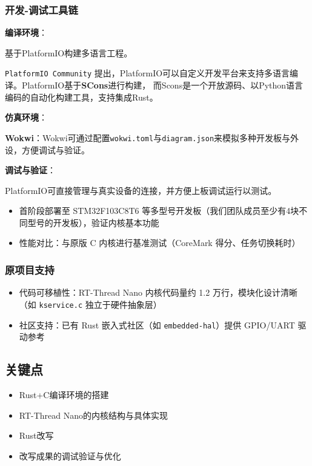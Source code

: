 \subsubsection{开发-调试工具链}

\textbf{编译环境}：

基于PlatformIO构建多语言工程。

{\texttt{PlatformIO Community}} 提出，PlatformIO可以自定义开发平台来支持多语言编译\cite{Kasbah_2016}。PlatformIO基于\textbf{SCons}\cite{PlatformIO_2025}进行构建，
而Scons是一个开放源码、以Python语言编码的自动化构建工具，支持集成Rust\cite{SCons}。

\textbf{仿真环境}：

\textbf{Wokwi}：Wokwi可通过配置\texttt{wokwi.toml}与\texttt{diagram.json}来模拟多种开发板与外设，方便调试与验证。\cite{Wokwi}

\textbf{调试与验证}：

PlatformIO可直接管理与真实设备的连接，并方便上板调试运行以测试。
\begin{itemize}
    \item 首阶段部署至 STM32F103C8T6 等多型号开发板（我们团队成员至少有4块不同型号的开发板），验证内核基本功能
    \item 性能对比：与原版 C 内核进行基准测试（CoreMark 得分、任务切换耗时）
\end{itemize}

\subsubsection{原项目支持}

\begin{itemize}
    \item 代码可移植性：RT-Thread Nano 内核代码量约 1.2 万行，模块化设计清晰（如 \texttt{kservice.c} 独立于硬件抽象层）\cite{RTThreadDoc}
    \item 社区支持：已有 Rust 嵌入式社区（如 \texttt{embedded-hal}）提供 GPIO/UART 驱动参考
\end{itemize}

\subsection{关键点}

\begin{itemize}
    \item Rust+C编译环境的搭建
    \item RT-Thread Nano的内核结构与具体实现
    \item Rust改写
    \item 改写成果的调试验证与优化
\end{itemize}

